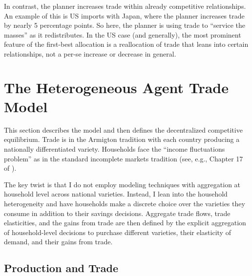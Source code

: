 \documentclass[12pt,pdftex]{article}
\begin{document}
\begin{onehalfspacing}
In contrast, the planner increases trade within already competitive relationships. An example of this is US imports with Japan, where the planner increases trade by nearly 5 percentage points. So here, the planner is using trade to ``service the masses'' as it redistributes. In the US case (and generally), the most prominent feature of the first-best allocation is a reallocation of trade that leans into certain relationships, not a per-se increase or decrease in general.





\section{The Heterogeneous Agent Trade Model}

This section describes the model and then defines the decentralized competitive equilibrium. Trade is in the Armigton tradition with each country producing a nationally differentiated variety. Households face the ``income fluctuations problem'' as in the standard incomplete markets tradition (see, e.g., Chapter 17 of \citet{ljungqvist2012recursive}).

The key twist is that I do not employ modeling techniques with aggregation at household level across national varieties. Instead, I lean into the household heterogeneity and have households make a discrete choice over the varieties they consume in addition to their savings decisions. Aggregate trade flows, trade elasticities, and the gains from trade are then defined by the explicit aggregation of household-level decisions to purchase different varieties, their elasticity of demand, and their gains from trade.

\subsection{Production and Trade}\label{sec:trade}


\end{onehalfspacing}
\end{document}
